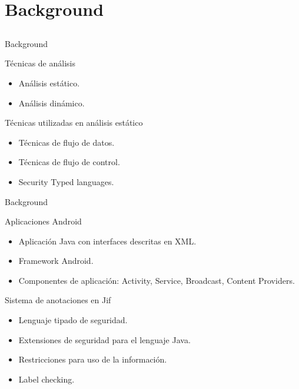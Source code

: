 \section{Background}
\subsection{}
\begin{frame}{Background}
	\begin{block}{Técnicas de análisis}
	\begin{itemize}
	  \pause
	  \item Análisis estático. \pause 
	  \item Análisis dinámico. \pause
	\end{itemize}
	\end{block}
	\pause
	\begin{block}{Técnicas utilizadas en análisis estático}
	\begin{itemize}
	  \pause
	  \item Técnicas de flujo de datos. \pause 
	  \item Técnicas de flujo de control. \pause
	  \item Security Typed languages.
	\end{itemize}
	\end{block}
\end{frame}
\begin{frame}{Background}
	\begin{block}{Aplicaciones Android}
	\begin{itemize}
	  \pause
	  \item Aplicación Java con interfaces descritas en XML.\pause
	  \item Framework Android.\pause
	  \item Componentes de
	  aplicación: Activity, Service, Broadcast, Content Providers.\pause
	\end{itemize}
	\pause
	\end{block}
	\begin{block}{Sistema de anotaciones en Jif}
	\begin{itemize}
	  \pause
	  \item Lenguaje tipado de seguridad.\pause
	  \item Extensiones de seguridad para el lenguaje Java.\pause
	  \item Restricciones para uso de la información.\pause
	  \item Label checking.
	\end{itemize}
	\end{block}
\end{frame}
